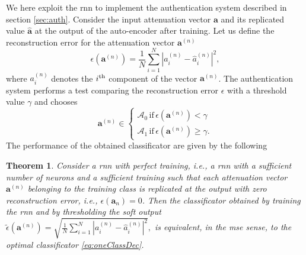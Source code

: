 \documentclass[draftcls,onecolumn,12pt]{IEEEtran}
\newtheorem{theorem}{Theorem}
\begin{document}
We here exploit the \ac{rnn} to implement the authentication system described in section \ref{sec:auth}. Consider the input attenuation vector $\bm{a}$ and its replicated value $\hat{\bm{a}}$ at the output of the auto-encoder after training.
Let us define the reconstruction error for the attenuation vector $\bm{a}^{(n)}$
\begin{equation}\label{eq: rec err}
    \epsilon(\bm{a}^{(n)}) = \frac{1}{N}\sum_{i=1}^{N}|a^{(n)}_i-\hat{a}^{(n)}_i|^2,
\end{equation}
where $a_i^{(n)}$ denotes the $i^{\rm th}$ component of the vector $\bm{a}^{(n)}$. The authentication system performs a test comparing the reconstruction error $\epsilon$ with a threshold value $\gamma$ and chooses 
\begin{equation}
\bm{a}^{(n)} \in
\begin{cases}
\mathcal{A}_0 \, \text{if} \, \epsilon(\bm{a}^{(n)}) < \gamma \\
\mathcal{A}_1 \, \text{if} \, \epsilon(\bm{a}^{(n)}) \ge \gamma. 
\end{cases}
\end{equation}
The performance of the obtained classificator are given by the following 
\begin{theorem}
    Consider a \ac{rnn} with perfect training, i.e., a \ac{rnn} with a sufficient number of neurons and a sufficient training such that each attenuation vector $\bm{a}^{(n)}$ belonging to the training class is replicated at the output with zero reconstruction error, i.e., $\epsilon(\bm{a}_n)=0$. Then the classificator obtained by training the \ac{rnn} and by thresholding the soft output $\tilde{\epsilon}(\bm{a}^{(n)}) = \sqrt{\frac{1}{N}\sum_{i=1}^{N}|a^{(n)}_i-\hat{a}^{(n)}_i|^2},$ is equivalent, in the \ac{mse} sense, to the optimal classificator \eqref{eq:oneClassDec}.
\end{theorem}
\end{document}
